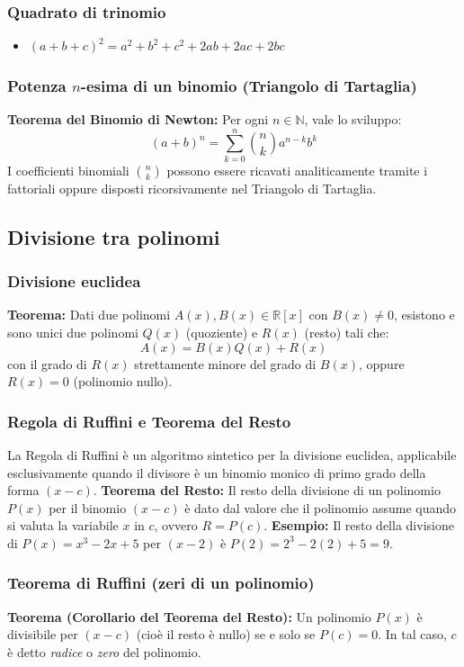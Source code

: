 \subsubsection{Quadrato di trinomio}
\begin{itemize}
    \item $(a+b+c)^2 = a^2 + b^2 + c^2 + 2ab + 2ac + 2bc$
\end{itemize}
\subsubsection{Potenza $n$-esima di un binomio (Triangolo di Tartaglia)}
\textbf{Teorema del Binomio di Newton:} Per ogni $n \in \mathbb{N}$, vale lo sviluppo:
\[
(a+b)^n = \sum_{k=0}^n \binom{n}{k} a^{n-k}b^k
\]
I coefficienti binomiali $\binom{n}{k}$ possono essere ricavati analiticamente tramite i fattoriali oppure disposti ricorsivamente nel Triangolo di Tartaglia.

\subsection{Divisione tra polinomi}
\subsubsection{Divisione euclidea}
\textbf{Teorema:} Dati due polinomi $A(x), B(x) \in \mathbb{R}[x]$ con $B(x) \neq 0$, esistono e sono unici due polinomi $Q(x)$ (quoziente) e $R(x)$ (resto) tali che:
\[ A(x) = B(x)Q(x) + R(x) \]
con il grado di $R(x)$ strettamente minore del grado di $B(x)$, oppure $R(x)=0$ (polinomio nullo).

\subsubsection{Regola di Ruffini e Teorema del Resto}
La Regola di Ruffini è un algoritmo sintetico per la divisione euclidea, applicabile esclusivamente quando il divisore è un binomio monico di primo grado della forma $(x-c)$.
\textbf{Teorema del Resto:} Il resto della divisione di un polinomio $P(x)$ per il binomio $(x-c)$ è dato dal valore che il polinomio assume quando si valuta la variabile $x$ in $c$, ovvero $R = P(c)$.
\textbf{Esempio:} Il resto della divisione di $P(x) = x^3 - 2x + 5$ per $(x-2)$ è $P(2) = 2^3 - 2(2) + 5 = 9$.

\subsubsection{Teorema di Ruffini (zeri di un polinomio)}
\textbf{Teorema (Corollario del Teorema del Resto):} Un polinomio $P(x)$ è divisibile per $(x-c)$ (cioè il resto è nullo) se e solo se $P(c) = 0$. In tal caso, $c$ è detto \textit{radice} o \textit{zero} del polinomio.

